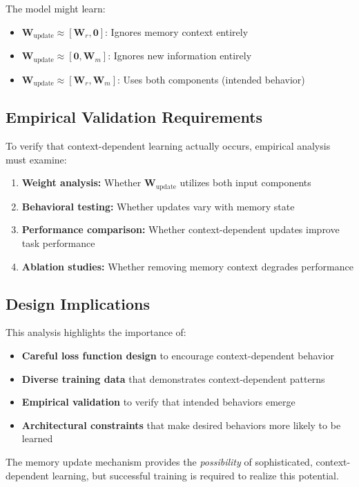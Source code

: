 \documentclass{article}
\begin{document}
The model might learn:
\begin{itemize}
\item $\mathbf{W}_{\text{update}} \approx [\mathbf{W}_r, \mathbf{0}]$: Ignores memory context entirely
\item $\mathbf{W}_{\text{update}} \approx [\mathbf{0}, \mathbf{W}_m]$: Ignores new information entirely
\item $\mathbf{W}_{\text{update}} \approx [\mathbf{W}_r, \mathbf{W}_m]$: Uses both components (intended behavior)
\end{itemize}

\subsection{Empirical Validation Requirements}

To verify that context-dependent learning actually occurs, empirical analysis must examine:
\begin{enumerate}
\item \textbf{Weight analysis:} Whether $\mathbf{W}_{\text{update}}$ utilizes both input components
\item \textbf{Behavioral testing:} Whether updates vary with memory state
\item \textbf{Performance comparison:} Whether context-dependent updates improve task performance
\item \textbf{Ablation studies:} Whether removing memory context degrades performance
\end{enumerate}

\subsection{Design Implications}

This analysis highlights the importance of:
\begin{itemize}
\item \textbf{Careful loss function design} to encourage context-dependent behavior
\item \textbf{Diverse training data} that demonstrates context-dependent patterns
\item \textbf{Empirical validation} to verify that intended behaviors emerge
\item \textbf{Architectural constraints} that make desired behaviors more likely to be learned
\end{itemize}

The memory update mechanism provides the \textit{possibility} of sophisticated, context-dependent learning, but successful training is required to realize this potential.
\end{document}
